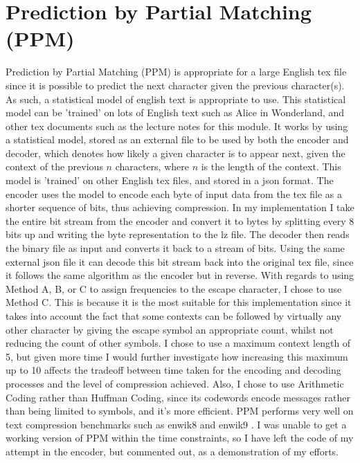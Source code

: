 \documentclass[a4paper, 11pt]{article}
\numberwithin{equation}{section}
\theoremstyle{plain}
\theoremstyle{definition}
\begin{document}
\section{Prediction by Partial Matching (PPM)}

Prediction by Partial Matching (PPM) is appropriate for a large English tex file since it is possible to 
predict the next character given the previous character(s). 
As such, a statistical model of english text is appropriate to use. 
This statistical model can be 'trained' on lots of English text such as Alice in Wonderland, 
and other tex documents such as the lecture notes for this module. 
It works by using a statistical model, stored as an external file to be used by both the encoder and decoder, 
which denotes how likely a given character is to appear next, given the context of the previous $n$ characters, 
where $n$ is the length of the context. 
This model is 'trained' on other English tex files, and stored in a json format. 
The encoder uses the model to encode each byte of input data from the tex file as a shorter sequence of bits, 
thus achieving compression. 
In my implementation I take the entire bit stream from the encoder and convert it to bytes by splitting 
every 8 bits up and writing the byte representation to the lz file. 
The decoder then reads the binary file as input and converts it back to a stream of bits. 
Using the same external json file it can decode this bit stream back into the original tex file, since it 
follows the same algorithm as the encoder but in reverse. 
With regards to using Method A, B, or C to assign frequencies to the escape character, I chose to use 
Method C. 
This is because it is the most suitable for this implementation since it takes into account the fact that 
some contexts can be followed by virtually any other character by giving the escape symbol an appropriate count, 
whilst not reducing the count of other symbols. 
I chose to use a maximum context length of 5, but given more time I would further investigate how 
increasing this maximum up to 10 affects the tradeoff between time taken for the encoding and decoding 
processes and the level of compression achieved. 
Also, I chose to use Arithmetic Coding rather than Huffman Coding, since its codewords encode messages 
rather than being limited to symbols, and it's more efficient. 
PPM performs very well on text compression benchmarks such as enwik8 and enwik9 \cite{TextBenchmark}. 
I was unable to get a working version of PPM within the time constraints, so I have left the code of 
my attempt in the encoder, but commented out, as a demonstration of my efforts. 
\end{document}
